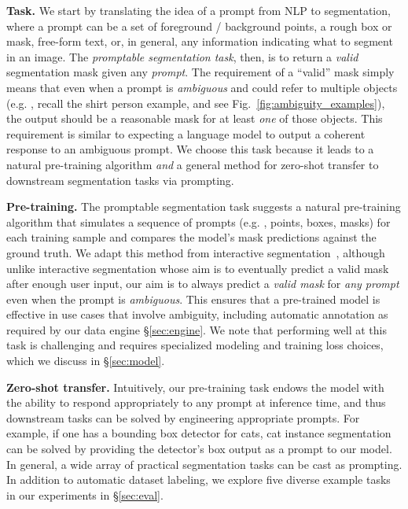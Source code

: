 \textbf{Task.} We start by translating the idea of a prompt from NLP to segmentation, where a prompt can be a set of foreground / background points, a rough box or mask, free-form text, or, in general, any information indicating what to segment in an image. The \emph{promptable segmentation task}, then, is to return a \emph{valid} segmentation mask given any \emph{prompt}. The requirement of a ``valid'' mask simply means that even when a prompt is \emph{ambiguous} and could refer to multiple objects (e.g. , recall the shirt \vs person example, and see Fig.~\ref{fig:ambiguity_examples}), the output should be a reasonable mask for at least \emph{one} of those objects. This requirement is similar to expecting a language model to output a coherent response to an ambiguous prompt. We choose this task because it leads to a natural pre-training algorithm \emph{and} a general method for zero-shot transfer to downstream segmentation tasks via prompting.

\textbf{Pre-training.} The promptable segmentation task suggests a natural pre-training algorithm that simulates a sequence of prompts (e.g. , points, boxes, masks) for each training sample and compares the model's mask predictions against the ground truth. We adapt this method from interactive segmentation~\cite{xu2016deep,mahadevan2018iteratively}, although unlike interactive segmentation whose aim is to eventually predict a valid mask after enough user input, our aim is to always predict a \emph{valid mask} for \emph{any prompt} even when the prompt is \emph{ambiguous}. This ensures that a pre-trained model is effective in use cases that involve ambiguity, including automatic annotation as required by our data engine \S\ref{sec:engine}. We note that performing well at this task is challenging and requires specialized modeling and training loss choices, which we discuss in \S\ref{sec:model}.

\textbf{Zero-shot transfer.} Intuitively, our pre-training task endows the model with the ability to respond appropriately to any prompt at inference time, and thus downstream tasks can be solved by engineering appropriate prompts. For example, if one has a bounding box detector for cats, cat instance segmentation can be solved by providing the detector's box output as a prompt to our model. In general, a wide array of practical segmentation tasks can be cast as prompting. In addition to automatic dataset labeling, we explore five diverse example tasks in our experiments in \S\ref{sec:eval}.

